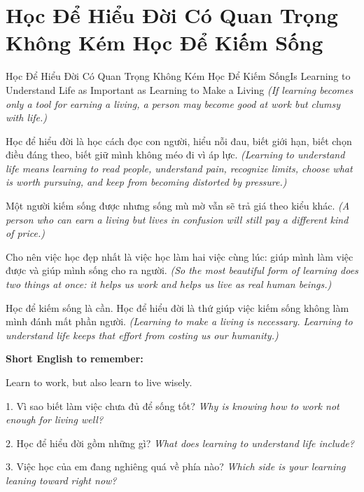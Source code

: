 \section{Học Để Hiểu Đời Có Quan Trọng Không Kém Học Để Kiếm Sống}
\begin{truyen}{Học Để Hiểu Đời Có Quan Trọng Không Kém Học Để Kiếm Sống}{Is Learning to Understand Life as Important as Learning to Make a Living}
\textit{(If learning becomes only a tool for earning a living, a person may become good at work but clumsy with life.)}

Học để hiểu đời là học cách đọc con người, hiểu nỗi đau, biết giới hạn, biết chọn điều đáng theo, biết giữ mình không méo đi vì áp lực.
\textit{(Learning to understand life means learning to read people, understand pain, recognize limits, choose what is worth pursuing, and keep from becoming distorted by pressure.)}

Một người kiếm sống được nhưng sống mù mờ vẫn sẽ trả giá theo kiểu khác.
\textit{(A person who can earn a living but lives in confusion will still pay a different kind of price.)}

Cho nên việc học đẹp nhất là việc học làm hai việc cùng lúc: giúp mình làm việc được và giúp mình sống cho ra người.
\textit{(So the most beautiful form of learning does two things at once: it helps us work and helps us live as real human beings.)}
\end{truyen}

\begin{baihoc}
Học để kiếm sống là cần. Học để hiểu đời là thứ giúp việc kiếm sống không làm mình đánh mất phần người.
\textit{(Learning to make a living is necessary. Learning to understand life keeps that effort from costing us our humanity.)}
\end{baihoc}

\begin{ghinhoanh}
\textbf{Short English to remember:}

Learn to work, but also learn to live wisely.

\end{ghinhoanh}

\begin{tuhocnhanh}
1. Vì sao biết làm việc chưa đủ để sống tốt? \textit{Why is knowing how to work not enough for living well?}

2. Học để hiểu đời gồm những gì? \textit{What does learning to understand life include?}

3. Việc học của em đang nghiêng quá về phía nào? \textit{Which side is your learning leaning toward right now?}
\end{tuhocnhanh}
\ngancach

